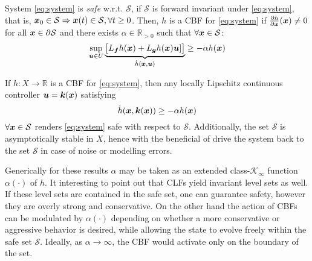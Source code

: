 \begin{definition} System \eqref{eq:system} is \textit{safe} w.r.t. $\mathcal{S}$, if $\mathcal{S}$ is forward invariant under \eqref{eq:system}, that is, $\boldsymbol{x}_0\in\mathcal{S}\Rightarrow \boldsymbol{x}(t)\in\mathcal{S}, \forall t\geq0$.
Then, $h$ is a CBF for \eqref{eq:system} if $\frac{\partial{h}}{\partial \boldsymbol{x}} (\boldsymbol{x})\neq 0$ for all $\boldsymbol{x}\in \partial{\mathcal{S}}$ and there exists $\alpha \in \mathbb{R}_{>0}$ such that $\forall \boldsymbol{x} \in \mathcal{S}$: 
\begin{equation}
\sup_{\boldsymbol{u}\in U} \underbrace{ 
\begin{bmatrix}
L_{\boldsymbol{f}}h(\boldsymbol{x}) + L_{\boldsymbol{g}}h(\boldsymbol{x})\boldsymbol{u}] 
\end{bmatrix}}_{\dot{h}(\boldsymbol{x},\boldsymbol{u})}\geq -\alpha h(\boldsymbol{x})
\end{equation}


\begin{theorem}
    \label{th:cbf}If $h : X \to \mathbb{R}$ is a CBF for \eqref{eq:system}, then any locally Lipschitz continuous controller $\boldsymbol{u} = \boldsymbol{k}(\boldsymbol{x})$ satisfying
\begin{equation}
\dot{h}(\boldsymbol{x},\boldsymbol{k}(\boldsymbol{x}))\geq -\alpha h(\boldsymbol{x})
\label{cond:2}
\end{equation}
$\forall{\boldsymbol{x}}\in\mathcal{S}$ renders \eqref{eq:system} safe with respect to $\mathcal{S}$. Additionally, the set $\mathcal{S}$ is asymptotically stable in $X$, hence with the beneficial of drive the system back to the set $\mathcal{S}$ in case of noise or modelling errors.
\end{theorem}
\end{definition}
\noindent
Generically for these results $\alpha$ may be taken as an extended class-$\mathcal{K}_{\infty}$ function $\alpha(\cdot)$ of $h$.
It interesting to point out that CLFs yield invariant level sets as well. If these level sets are contained in the safe set, one can guarantee safety, however they are overly strong and conservative. On the other hand the action of CBFs can be modulated by $\alpha(\cdot)$ depending on whether a more conservative or aggressive behavior is desired, while allowing the state to evolve freely within the safe set $\mathcal{S}$. Ideally, as $\alpha \to \infty$, the CBF would activate only on the boundary of the set.


